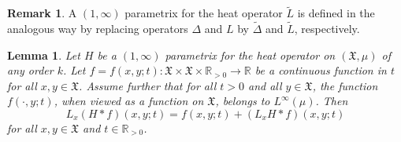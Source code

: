 \documentclass[11pt,reqno]{amsart}
\newtheorem{lemma}[theorem]{Lemma}
\theoremstyle{remark}
\theoremstyle{definition}
\newtheorem{remark}{Remark}
\numberwithin{theorem}{section} \numberwithin{equation}{section}
\newcommand{\X}{\mathfrak{X}}
\begin{document}
\begin{remark}
  A $(1,\infty)$ parametrix for the heat operator $\tilde L$ is defined in the analogous way by
  replacing operators $\Delta$ and $L$ by $\tilde \Delta$ and $\tilde L$, respectively.
\end{remark}


\begin{lemma}
\label{lem: L of convol 1, infty}
Let $H$ be a $(1,\infty)$ parametrix for the heat operator on $(\X,\mu)$ of any order $k$.
Let $f=f(x,y;t):\X\times \X\times\mathbb{R}_{> 0}\to\mathbb{R}$
be a continuous function in $t$ for all $x,y\in \X$. Assume further that for all $t>0$ and all $y\in\X$, the function
$f(\cdot,y;t)$, when viewed as a function on $\X$, belongs to $L^\infty(\mu)$.  Then
$$
L_{x}( H\ast f)(x,y;t)=f(x,y;t)+(L_{x}H \ast f)(x,y;t)
$$
for all $x,y\in \X$ and $t\in\mathbb{R}_{>0}$.
\end{lemma}
\end{document}
